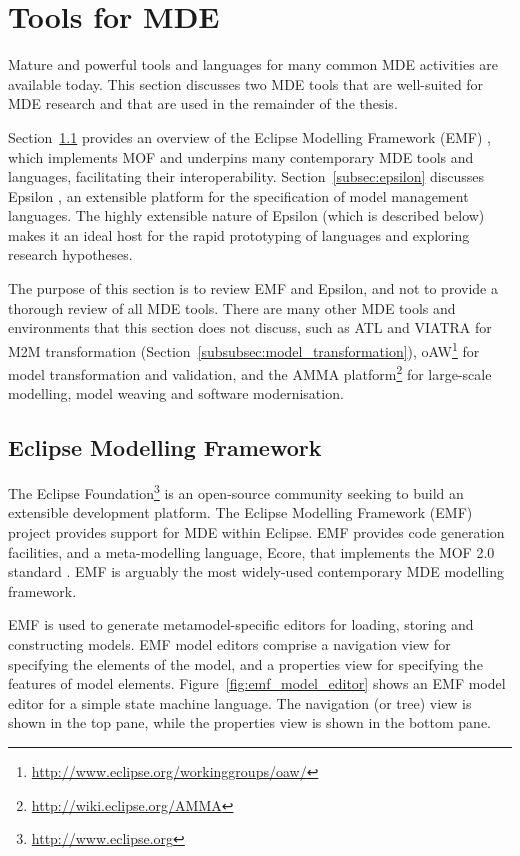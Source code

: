 
\section{Tools for MDE}
\label{sec:mde_tools}
Mature and powerful tools and languages for many common MDE activities are available today. This section discusses two MDE tools that are well-suited for MDE research and that are used in the remainder of the thesis.

Section~\ref{subsec:emf} provides an overview of the Eclipse Modelling Framework (EMF) \cite{steinberg09emf}, which implements MOF and underpins many contemporary MDE tools and languages, facilitating their interoperability. Section~\ref{subsec:epsilon} discusses Epsilon \cite{kolovos09thesis}, an extensible platform for the specification of model management languages. The highly extensible nature of Epsilon (which is described below) makes it an ideal host for the rapid prototyping of languages and exploring research hypotheses.  

The purpose of this section is to review EMF and Epsilon, and not to provide a thorough review of all MDE tools. There are many other MDE tools and environments that this section does not discuss, such as ATL and VIATRA for M2M transformation (Section~\ref{subsubsec:model_transformation}), oAW\footnote{\url{http://www.eclipse.org/workinggroups/oaw/}} for model transformation and validation, and the AMMA platform\footnote{\url{http://wiki.eclipse.org/AMMA}} for large-scale modelling, model weaving and software modernisation.

\subsection{Eclipse Modelling Framework}
\label{subsec:emf}
The Eclipse Foundation\footnote{\url{http://www.eclipse.org}} is an open-source community seeking to build an extensible development platform. The Eclipse Modelling Framework (EMF) project \cite{steinberg09emf} provides support for MDE within Eclipse. EMF provides code generation facilities, and a meta-modelling language, Ecore, that implements the MOF 2.0 standard \cite{mof}. EMF is arguably the most widely-used contemporary MDE modelling framework.

EMF is used to generate metamodel-specific editors for loading, storing and constructing models. EMF model editors comprise a navigation view for specifying the elements of the model, and a properties view for specifying the features of model elements. Figure~\ref{fig:emf_model_editor} shows an EMF model editor for a simple state machine language. The navigation (or tree) view is shown in the top pane, while the properties view is shown in the bottom pane.

